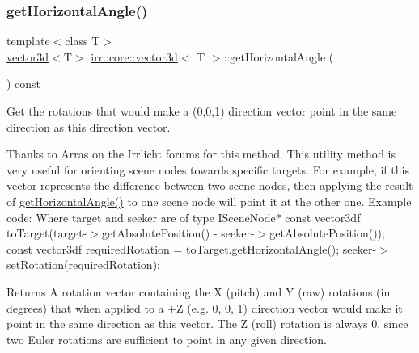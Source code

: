\subsubsection{\texorpdfstring{get\+Horizontal\+Angle()}{getHorizontalAngle()}\hspace{0.1cm}{\footnotesize\ttfamily [2/2]}}
{\footnotesize\ttfamily template$<$class T$>$ \\
\hyperlink{classirr_1_1core_1_1vector3d}{vector3d}$<$T$>$ \hyperlink{classirr_1_1core_1_1vector3d}{irr\+::core\+::vector3d}$<$ T $>$\+::get\+Horizontal\+Angle (\begin{DoxyParamCaption}{ }\end{DoxyParamCaption}) const\hspace{0.3cm}{\ttfamily [inline]}}



Get the rotations that would make a (0,0,1) direction vector point in the same direction as this direction vector. 

Thanks to Arras on the Irrlicht forums for this method. This utility method is very useful for orienting scene nodes towards specific targets. For example, if this vector represents the difference between two scene nodes, then applying the result of \hyperlink{classirr_1_1core_1_1vector3d_a2c622aa988b4ea1d2e381632f99f8015}{get\+Horizontal\+Angle()} to one scene node will point it at the other one. Example code\+: Where target and seeker are of type I\+Scene\+Node$\ast$ const vector3df to\+Target(target-\/$>$get\+Absolute\+Position() -\/ seeker-\/$>$get\+Absolute\+Position()); const vector3df required\+Rotation = to\+Target.\+get\+Horizontal\+Angle(); seeker-\/$>$set\+Rotation(required\+Rotation);

\begin{DoxyReturn}{Returns}
A rotation vector containing the X (pitch) and Y (raw) rotations (in degrees) that when applied to a +Z (e.\+g. 0, 0, 1) direction vector would make it point in the same direction as this vector. The Z (roll) rotation is always 0, since two Euler rotations are sufficient to point in any given direction. 
\end{DoxyReturn}
\mbox{\label{classirr_1_1core_1_1vector3d_aee3351232fa6ebd6241a89bebdaeaedf}} 
